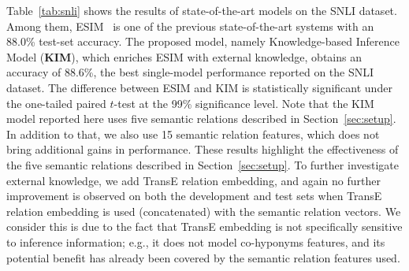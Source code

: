 \documentclass[11pt,a4paper]{article}
\begin{document}
Table~\ref{tab:snli} shows the results of state-of-the-art models on the SNLI dataset. 
Among them, ESIM~\citep{DBLP:conf/acl/ChenZLWJI17} is one of the previous state-of-the-art systems with an 88.0\% test-set accuracy. The proposed model, namely Knowledge-based Inference Model (\textbf{KIM}), which enriches ESIM with external knowledge, obtains an accuracy of 88.6\%, the best single-model performance reported on the SNLI dataset. The difference between ESIM and KIM is statistically significant under the one-tailed paired $t$-test at the 99\% significance level. Note that the KIM model reported here uses five semantic relations described in Section~\ref{sec:setup}. In addition to that, we also use 15 semantic relation features, which does not bring additional gains in performance. These results highlight the effectiveness of the five semantic relations described in Section~\ref{sec:setup}. To further investigate external knowledge, we add TransE relation embedding, and again no further improvement is observed on both the development and test sets when TransE relation embedding is used (concatenated) with the semantic relation vectors. We consider this is due to the fact that TransE embedding is not specifically sensitive to inference information; e.g., it does not model co-hyponyms features, and its potential benefit has already been covered by the semantic relation features used.   

\begin{table}[t!]
\renewcommand{\arraystretch}{0.9}
\begin{center}
\end{center}
\caption{Accuracies of models on SNLI. }
\label{tab:snli}
\end{table}
\end{document}
